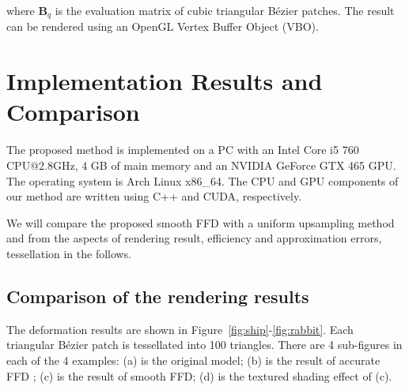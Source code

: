 \documentclass[3p]{elsarticle}
\begin{document}
\noindent where $\mathbf B_q$ is the evaluation matrix of cubic triangular B\'ezier patches. The result can be rendered
using an OpenGL Vertex Buffer Object (VBO).


\section{Implementation Results and Comparison}

The proposed method is implemented on a PC with an Intel Core i5 760 CPU@2.8GHz, 4 GB of main memory and an NVIDIA
GeForce GTX 465 GPU. The operating system is Arch Linux x86\_64. The CPU and GPU components of our method are written
using C++ and CUDA, respectively.

We will compare the proposed smooth FFD with a uniform upsampling method and \cite{Cui13, Cui14} from the aspects of
rendering result, efficiency and approximation errors, tessellation in the follows.

\subsection{Comparison of the rendering results}
\label{sec:comparison_of_rendering}

The deformation results are shown in Figure~\ref{fig:ship}-\ref{fig:rabbit}. Each triangular B\'ezier patch is
tessellated into 100 triangles. There are 4 sub-figures in each of the 4 examples: (a) is the original model; (b) is the
result of accurate FFD \cite{Cui13, Cui14}; (c) is the result of smooth FFD; (d) is the textured shading effect of (c).
\end{document}
